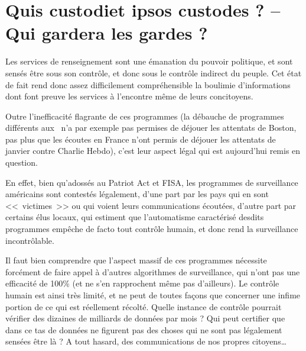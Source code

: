 
\chapter{Quis custodiet ipsos custodes ? -- Qui gardera les gardes ?}
\label{impact}


Les services de renseignement sont une émanation du pouvoir
politique, et sont sensés être sous son contrôle, et donc sous le contrôle
indirect du peuple. Cet état de fait rend donc assez difficilement
compréhensible la boulimie d'informations dont font preuve les services à
l'encontre même de leurs  concitoyens.

Outre l'inefficacité flagrante de ces programmes\cite{surve}
(la débauche de programmes différents aux \EUA~n'a par exemple pas permises de
déjouer les attentats de Boston, pas plus que les écoutes en France n'ont permis de déjouer
les attentats de janvier contre Charlie Hebdo), c'est leur aspect légal qui est
aujourd'hui remis en question.

En effet, bien qu'adossés au Patriot Act et FISA, les programmes
de surveillance américains sont contestés légalement, d'une part par les pays qui
en sont <<~victimes~>> ou qui voient leurs communications écoutées, d'autre part
par certains élus locaux, qui estiment que l'automatisme caractérisé desdits
programmes empêche de facto tout contrôle humain, et donc rend la surveillance
incontrôlable.

Il faut bien comprendre que l'aspect massif de ces programmes
nécessite forcément de faire appel à d'autres algorithmes de surveillance, qui
n'ont pas une efficacité de 100\% (et ne s'en rapprochent même pas d'ailleurs).
Le contrôle humain est ainsi très limité, et ne peut de toutes façons que
concerner une infime portion de ce qui est réellement récolté. Quelle instance
de contrôle pourrait vérifier des dizaines de milliards de données par mois ?
Qui peut certifier que dans ce tas de données ne figurent pas des choses qui ne
sont pas légalement sensées être là ? A tout hasard, des communications de nos propres
citoyens\ldots 

